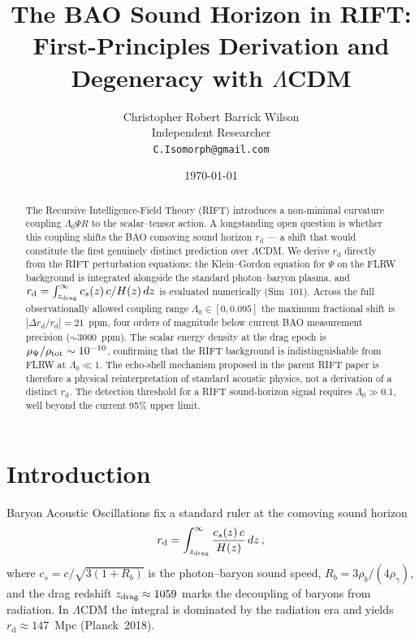 \documentclass[12pt,a4paper]{article}
\newcommand{\rd}{r_{\mathrm{d}}}
\begin{document}
\title{The BAO Sound Horizon in RIFT:\\
First-Principles Derivation and Degeneracy with $\Lambda$CDM}

\author{Christopher Robert Barrick Wilson\\
\small Independent Researcher\\
\small \texttt{C.Isomorph@gmail.com}}
\date{\today}
\maketitle

\begin{abstract}
The Recursive Intelligence-Field Theory (RIFT) introduces a non-minimal
curvature coupling $\Lambda_0\Psi R$ to the scalar--tensor action.  A
longstanding open question is whether this coupling shifts the BAO comoving
sound horizon $\rd$ --- a shift that would constitute the first genuinely
distinct prediction over $\Lambda$CDM.  We derive $\rd$ directly from the
RIFT perturbation equations: the Klein--Gordon equation for $\Psi$ on the
FLRW background is integrated alongside the standard photon--baryon plasma,
and $\rd = \int_{z_{\rm drag}}^\infty c_s(z)\,c/H(z)\,dz$ is evaluated
numerically (Sim~101).  Across the full observationally allowed coupling
range $\Lambda_0\in[0,0.095]$ the maximum fractional shift is
$|\Delta\rd/\rd| = 21$~ppm, four orders of magnitude below current BAO
measurement precision ($\sim 3000$~ppm).  The scalar energy density at the
drag epoch is $\rho_\Psi/\rho_{\rm tot}\sim10^{-10}$, confirming that the
RIFT background is indistinguishable from FLRW at $\Lambda_0\ll 1$.
The echo-shell mechanism proposed in the parent RIFT paper is therefore
a physical reinterpretation of standard acoustic physics, not a derivation
of a distinct $\rd$.  The detection threshold for a RIFT sound-horizon
signal requires $\Lambda_0\gg 0.1$, well beyond the current 95\% upper limit.
\end{abstract}

\section{Introduction}

Baryon Acoustic Oscillations fix a standard ruler at the comoving sound
horizon
\begin{equation}
\rd = \int_{z_{\rm drag}}^{\infty} \frac{c_s(z)\,c}{H(z)}\,dz\,,
\label{eq:rd}
\end{equation}
where $c_s = c/\sqrt{3(1+R_b)}$ is the photon--baryon sound speed,
$R_b = 3\rho_b/(4\rho_\gamma)$, and the drag redshift $z_{\rm drag}\approx1059$
marks the decoupling of baryons from radiation.  In $\Lambda$CDM the
integral is dominated by the radiation era and yields
$\rd\approx 147$~Mpc (Planck~2018).
\end{document}
